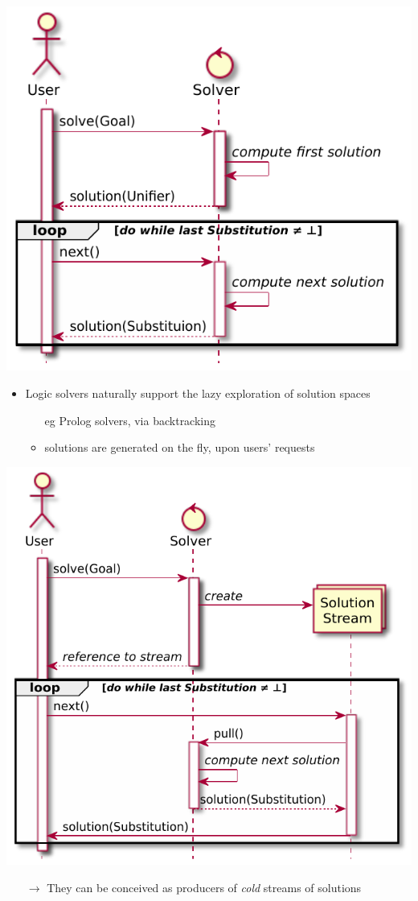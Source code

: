 \documentclass[presentation]{beamer}
\begin{document}
\begin{frame}[allowframebreaks]
    \begin{center}
        \includegraphics[width=.5\linewidth]{img/stateful-solver.pdf}
    \end{center}
    \begin{itemize}
        \item Logic solvers naturally support the \alert{lazy} exploration of solution spaces
        \begin{itemize}
            \item[eg] Prolog solvers, via \alert{backtracking}
            \item \alert{solutions} are generated on the fly, upon \alert{users'} requests
        \end{itemize}
    \end{itemize}
    
    \framebreak

    \begin{center}
        \includegraphics[width=.5\linewidth]{img/streamful-solver.pdf}
    \end{center}
    \begin{itemize}
        \item[$\rightarrow$] They can be conceived as \alert{producers} of \emph{cold} streams of solutions
    \end{itemize}

\end{frame}
\end{document}
